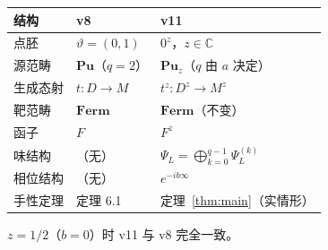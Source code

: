 \documentclass[11pt]{ctexart}
\theoremstyle{plain}
\theoremstyle{definition}
\newcommand{\Cat}{\mathbf}
\begin{document}
\begin{center}
\begin{tabular}{lll}
\hline
\textbf{结构} & \textbf{v8} & \textbf{v11} \\
\hline
点胚 & $\vartheta = (0,1)$ & $0^z$，$z\in\mathbb{C}$ \\
源范畴 & $\Cat{Pu}$（$q=2$） & $\Cat{Pu}_z$（$q$ 由 $a$ 决定） \\
生成态射 & $t: D\to M$ & $t^z: D^z\to M^z$ \\
靶范畴 & $\Cat{Ferm}$ & $\Cat{Ferm}$（不变） \\
函子 & $F$ & $F^z$ \\
味结构 & （无） & $\Psi_L = \bigoplus_{k=0}^{q-1}\Psi_L^{(k)}$ \\
相位结构 & （无） & $e^{-ib\infty}$ \\
手性定理 & 定理 6.1 & 定理~\ref{thm:main}（实情形） \\
\hline
\end{tabular}
\end{center}

$z = 1/2$（$b=0$）时 v11 与 v8 完全一致。
\end{document}
